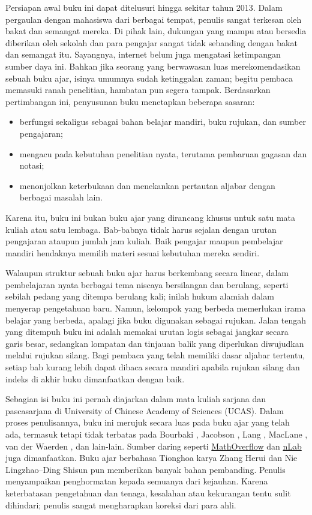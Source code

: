 Persiapan awal buku ini dapat ditelusuri hingga sekitar tahun 2013. Dalam pergaulan dengan mahasiswa dari berbagai tempat, penulis sangat terkesan oleh bakat dan semangat mereka. Di pihak lain, dukungan yang mampu atau bersedia diberikan oleh sekolah dan para pengajar sangat tidak sebanding dengan bakat dan semangat itu. Sayangnya, internet belum juga mengatasi ketimpangan sumber daya ini. Bahkan jika seorang yang berwawasan luas merekomendasikan sebuah buku ajar, isinya umumnya sudah ketinggalan zaman; begitu pembaca memasuki ranah penelitian, hambatan pun segera tampak. Berdasarkan pertimbangan ini, penyusunan buku menetapkan beberapa sasaran:
\begin{itemize}
	\item berfungsi sekaligus sebagai bahan belajar mandiri, buku rujukan, dan sumber pengajaran;
	\item mengacu pada kebutuhan penelitian nyata, terutama pembaruan gagasan dan notasi;
	\item menonjolkan keterbukaan dan menekankan pertautan aljabar dengan berbagai masalah lain.
\end{itemize}
Karena itu, buku ini bukan buku ajar yang dirancang khusus untuk satu mata kuliah atau satu lembaga. Bab-babnya tidak harus sejalan dengan urutan pengajaran ataupun jumlah jam kuliah. Baik pengajar maupun pembelajar mandiri hendaknya memilih materi sesuai kebutuhan mereka sendiri.

Walaupun struktur sebuah buku ajar harus berkembang secara linear, dalam pembelajaran nyata berbagai tema niscaya bersilangan dan berulang, seperti sebilah pedang yang ditempa berulang kali; inilah hukum alamiah dalam menyerap pengetahuan baru. Namun, kelompok yang berbeda memerlukan irama belajar yang berbeda, apalagi jika buku digunakan sebagai rujukan. Jalan tengah yang ditempuh buku ini adalah memakai urutan logis sebagai jangkar secara garis besar, sedangkan lompatan dan tinjauan balik yang diperlukan diwujudkan melalui rujukan silang. Bagi pembaca yang telah memiliki dasar aljabar tertentu, setiap bab kurang lebih dapat dibaca secara mandiri apabila rujukan silang dan indeks di akhir buku dimanfaatkan dengan baik.

Sebagian isi buku ini pernah diajarkan dalam mata kuliah sarjana dan pascasarjana di University of Chinese Academy of Sciences (UCAS). Dalam proses penulisannya, buku ini merujuk secara luas pada buku ajar yang telah ada, termasuk tetapi tidak terbatas pada Bourbaki \cite{Bou-Alg1, Bou-Alg2}, Jacobson \cite{Ja85, Ja89}, Lang \cite{Lang02}, MacLane \cite{ML98}, van der Waerden \cite{vdW1,vdW2}, dan lain-lain. Sumber daring seperti \href{http://mathoverflow.net}{MathOverflow} dan \href{http://ncatlab.org}{nLab} juga dimanfaatkan. Buku ajar berbahasa Tionghoa karya Zhang Herui \cite{ZHR} dan Nie Lingzhao--Ding Shisun \cite{DN00} pun memberikan banyak bahan pembanding. Penulis menyampaikan penghormatan kepada semuanya dari kejauhan. Karena keterbatasan pengetahuan dan tenaga, kesalahan atau kekurangan tentu sulit dihindari; penulis sangat mengharapkan koreksi dari para ahli.

